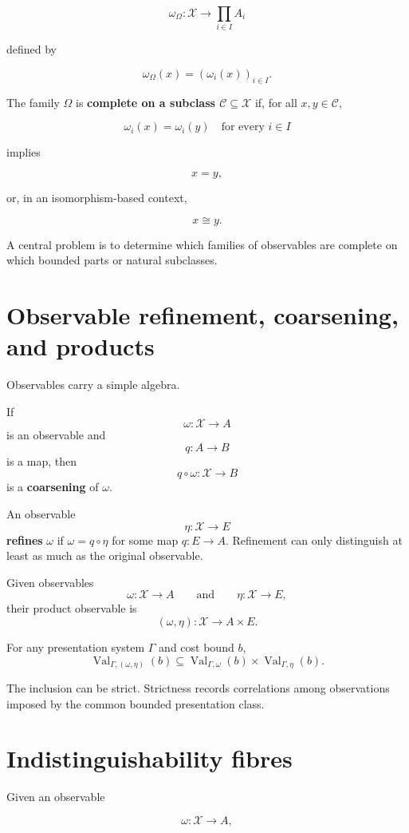 \documentclass[11pt]{article}
\begin{document}
\[
\omega_\Omega:\mathcal X\to \prod_{i\in I}A_i
\]

defined by

\[
\omega_\Omega(x)=(\omega_i(x))_{i\in I}.
\]

The family \(\Omega\) is \textbf{complete on a subclass \(\mathcal C\subseteq\mathcal X\)} if, for all \(x,y\in\mathcal C\),

\[
\omega_i(x)=\omega_i(y)\quad\text{for every }i\in I
\]

implies

\[
x=y,
\]

or, in an isomorphism-based context,

\[
x\cong y.
\]

A central problem is to determine which families of observables are complete on which bounded parts or natural subclasses.


\section{Observable refinement, coarsening, and products}

Observables carry a simple algebra.

If
\[
\omega:\mathcal X\to A
\]
is an observable and
\[
q:A\to B
\]
is a map, then
\[
q\circ\omega:\mathcal X\to B
\]
is a \textbf{coarsening} of \(\omega\).

An observable
\[
\eta:\mathcal X\to E
\]
\textbf{refines} \(\omega\) if \(\omega=q\circ\eta\) for some map \(q:E\to A\). Refinement can only distinguish at least as much as the original observable.

Given observables
\[
\omega:\mathcal X\to A
\qquad\text{and}\qquad
\eta:\mathcal X\to E,
\]
their product observable is
\[
(\omega,\eta):\mathcal X\to A\times E.
\]

For any presentation system \(\Gamma\) and cost bound \(b\),
\[
\operatorname{Val}_{\Gamma,(\omega,\eta)}(b)
\subseteq
\operatorname{Val}_{\Gamma,\omega}(b)\times
\operatorname{Val}_{\Gamma,\eta}(b).
\]

The inclusion can be strict. Strictness records correlations among observations imposed by the common bounded presentation class.


\section{Indistinguishability fibres}

Given an observable

\[
\omega:\mathcal X\to A,
\]
\end{document}
